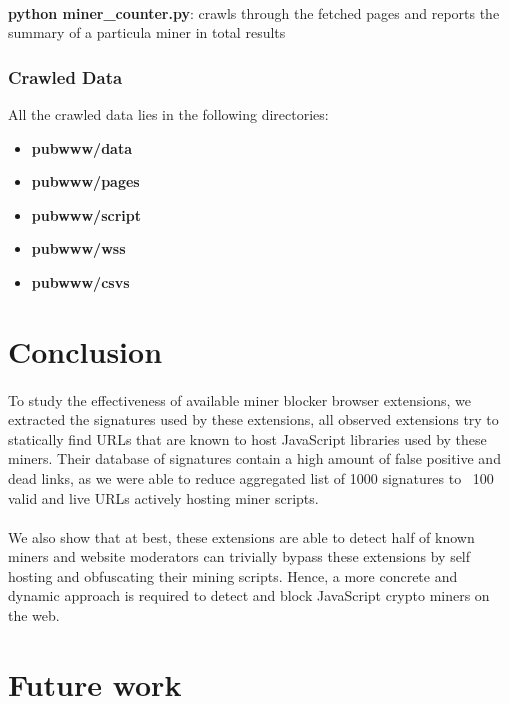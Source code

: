 \documentclass[letterpaper]{scrartcl} %
\numberwithin{equation}{section} %
\numberwithin{figure}{section} %
\numberwithin{table}{section} %
\begin{document}
\paragraph{}
\textbf{python miner\_counter.py}:
crawls through the fetched pages and reports the summary of a particula miner in total results

\subsubsection{Crawled Data}
All the crawled data lies in the following directories:
\begin{itemize}
\item \textbf{pubwww/data}
\item \textbf{pubwww/pages}
\item \textbf{pubwww/script}
\item \textbf{pubwww/wss}
\item \textbf{pubwww/csvs}
\end{itemize}

\section{Conclusion}
\paragraph{}
To study the effectiveness of available miner blocker browser extensions, we extracted the signatures used by these extensions, all observed extensions try to statically find URLs that are known to host JavaScript libraries used by these miners. Their database of signatures contain a high amount of false positive and dead links, as we were able to reduce aggregated list of 1000 signatures to ~100 valid and live URLs actively hosting miner scripts.

\paragraph{}
We also show that at best, these extensions are able to detect half of known miners and website moderators can trivially bypass these extensions by self hosting and obfuscating their mining scripts. Hence, a more concrete and dynamic approach is required to detect and block JavaScript crypto miners on the web.

\section{Future work}
\end{document}
